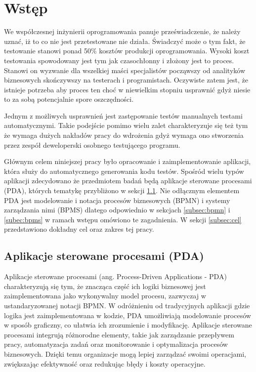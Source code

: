 \newpage %
\section{Wstęp}
We współczesnej inżynierii oprogramowania panuje przeświadczenie, że należy uznać, iż to co nie jest przetestowane nie działa. Świadczyć może o tym fakt, że testowanie stanowi ponad 50\% kosztów produkcji oprogramowania\cite{kumar2016impacts}. Wysoki koszt testowania spowodowany jest tym jak czasochłonny i złożony jest to proces\cite{jamil2016software}. Stanowi on wyzwanie dla wszelkiej maści specjalistów począwszy od analityków biznesowych skończywszy na testerach i programistach. Oczywiste zatem jest, że istnieje potrzeba aby proces ten choć w niewielkim stopniu usprawnić gdyż niesie to za sobą potencjalnie spore oszczędności.

Jednym z możliwych usprawnień jest zastępowanie testów manualnych testami automatycznymi. Takie podejście pomimo wielu zalet charakteryzuje się też tym że wymaga dużych nakładów pracy do wdrożenia gdyż wymaga ono stworzenia przez zespół deweloperski osobnego testującego programu\cite{kumar2016impacts}.

Głównym celem niniejszej pracy było opracowanie i zaimplementowanie aplikacji, która służy do automatycznego generowania kodu testów. Spośród wielu typów aplikacji zdecydowano że przedmiotem badań będą aplikacje sterowane procesami (PDA), których tematykę przybliżono w sekcji \ref{subsec:pda}. Nie odłącznym elementem PDA jest modelowanie i notacja procesów biznesowych (BPMN) i systemy zarządzania nimi (BPMS) dlatego odpowiednio w sekcjach \ref{subsec:bpmn} i \ref{subec:bpms} w ramach wstępu omówiono te zagadnienia. W sekcji \ref{subsec:cel} przedstawiono dokładny cel oraz zakres tej pracy.

\subsection{Aplikacje sterowane procesami (PDA)}
\label{subsec:pda}
Aplikacje sterowane procesami (ang. Process-Driven Applications - PDA) charakteryzują się tym, że znacząca część ich logiki biznesowej jest zaimplementowana  jako wykonywalny model procesu, zazwyczaj w ustandaryzowanej notacji BPMN. W odróżnieniu od tradycyjnych aplikacji gdzie logika jest zaimplementowana w kodzie, PDA umożliwiają modelowanie procesów w sposób graficzny, co ułatwia ich zrozumienie i modyfikację. Aplikacje sterowane procesami integrują różnorodne elementy, takie jak zarządzanie przepływem pracy, automatyzacja zadań oraz monitorowanie i optymalizacja procesów biznesowych. Dzięki temu organizacje mogą lepiej zarządzać swoimi operacjami, zwiększając efektywność oraz redukując błędy i koszty operacyjne\cite{Process-Driven-Applications-with-BPMN}.

